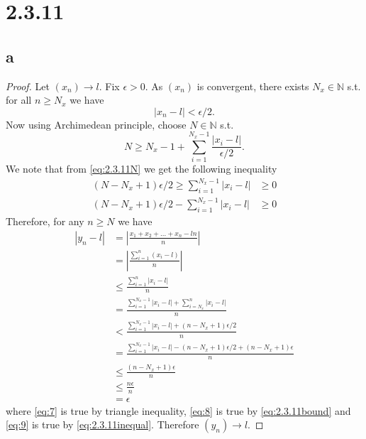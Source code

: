 \documentclass[10pt]{article}
\begin{document}
\section*{2.3.11}
\subsection*{a}
\begin{proof}
    Let $(x_n)\to l.$ Fix $\epsilon > 0.$ As $(x_n)$ is convergent, there exists $N_x\in\mathbb{N}$ s.t. for all $n\ge N_x$ we have
    \begin{equation} \label{eq:2.3.11bound}
        |x_n - l|<\epsilon/2.
    \end{equation}
    Now using Archimedean principle, choose $N \in\mathbb{N}$ s.t.
    \begin{equation} \label{eq:2.3.11N}
        N \ge N_x - 1 + \sum_{i=1}^{N_x - 1}\frac{|x_i-l|}{\epsilon/2}.
    \end{equation}
    We note that from \eqref{eq:2.3.11N} we get the following inequality
    \begin{align}
        (N-N_x+1)\epsilon/2 \ge \sum_{i=1}^{N_x - 1}|x_i-l| &\ge 0\nonumber\\
        (N-N_x+1)\epsilon/2 - \sum_{i=1}^{N_x - 1}|x_i-l| &\ge 0 \label{eq:2.3.11inequal}
    \end{align}
    Therefore, for any $n \ge N$ we have
    \begin{align}
        |y_n - l| &= \left |\frac{x_1+x_2+... + x_n-ln}{n}\right | \nonumber\\
        &= \left |\frac{\sum_{i=1}^{n}(x_i - l)}{n}\right | \nonumber\\
        &\le \frac{\sum_{i=1}^{n}|x_i - l|}{n} \label{eq:7}\\
        &= \frac{\sum_{i=1}^{N_x-1}|x_i - l| + \sum_{i=N_x}^{n}|x_i - l|}{n}  \nonumber\\
        &< \frac{\sum_{i=1}^{N_x - 1}|x_i - l|+ (n-N_x + 1)\epsilon/2}{n} \label{eq:8}\\
        &= \frac{\sum_{i=1}^{N_x - 1}|x_i - l| - (n-N_x + 1)\epsilon/2 + (n-N_x + 1)\epsilon}{n} \nonumber\\
        &\le \frac{(n-N_x + 1)\epsilon}{n} \label{eq:9}\\
        &\le \frac{n\epsilon}{n} \nonumber \\
        &= \epsilon \nonumber
    \end{align}
    where \eqref{eq:7} is true by triangle inequality, \eqref{eq:8} is true by \eqref{eq:2.3.11bound} and \eqref{eq:9} is true by \eqref{eq:2.3.11inequal}. Therefore $(y_n)\to l.$
\end{proof}
\end{document}
